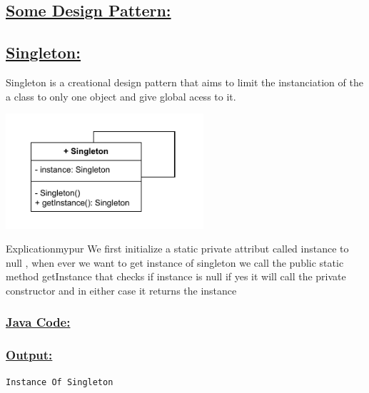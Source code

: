 \newpage
\subsection*{\underline{Some Design Pattern:}}

\subsection*{\underline{Singleton:}}
Singleton is a creational design pattern that aims to limit the instanciation
of the a class to only one object and give global acess to it.

\begin{center}
\includegraphics[width=0.55\textwidth,height=0.3\textheight]{Chapters/DesignPattern/Singleton/single.drawio.pdf}
\end{center}

\begin{prettyBox}{Explication}{mypur}
We first initialize a static private attribut called instance to null , when ever we want to get instance of singleton
we call the public static method getInstance that checks if instance is null if yes it will call the private constructor
and in either case it returns the instance 
\end{prettyBox}

\vspace{0.25cm}
\subsubsection*{\underline{Java Code:}}



\newpage



\subsubsection*{\underline{Output:}}
\begin{lstlisting}[style=cmd]
Instance Of Singleton
\end{lstlisting}

